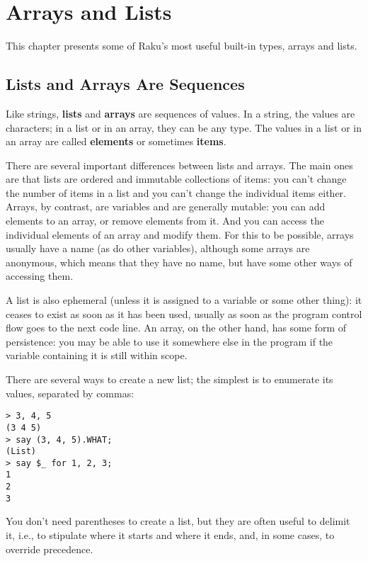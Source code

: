 

\chapter{Arrays and Lists}
\label{arrays}

This chapter presents some of Raku's most useful built-in types, 
arrays and lists.


\section{Lists and Arrays Are Sequences}
\label{sequence}

Like strings, {\bf lists} and {\bf arrays} are sequences of 
values.  In a string, the values are characters; in a list or
in an array, they can be any type.  The values in a list or 
in an array are called {\bf elements} or sometimes {\bf items}.

There are several important differences between lists and arrays. The main ones 
are that lists are ordered and immutable collections of items: 
you can't change the number of items in a list and you can't 
change the individual items either. Arrays, by contrast, are 
variables and are generally mutable: you can add elements 
to an array, or remove elements from it. And you can access 
the individual elements of an array and modify them. For this 
to be possible, arrays usually have a name (as do other variables), 
although some arrays are anonymous, which means that they 
have no name, but have some other ways of accessing them.

A list is also ephemeral (unless it is assigned 
to a variable or some other thing): it ceases to exist as 
soon as it has been used, usually as soon as the program 
control flow goes to the next code line. An array, on the 
other hand, has some form of persistence: you may be able to 
use it somewhere else in the program if the variable 
containing it is still within scope.

There are several ways to create a new list; the simplest is 
to enumerate its values, separated by commas:

\begin{verbatim}
> 3, 4, 5
(3 4 5)
> say (3, 4, 5).WHAT;
(List)
> say $_ for 1, 2, 3;
1
2
3
\end{verbatim}
%

You don't need parentheses to create a list, but they are 
often useful to delimit it, i.e., to stipulate where 
it starts and where it ends, and, in some cases, to override 
precedence.

